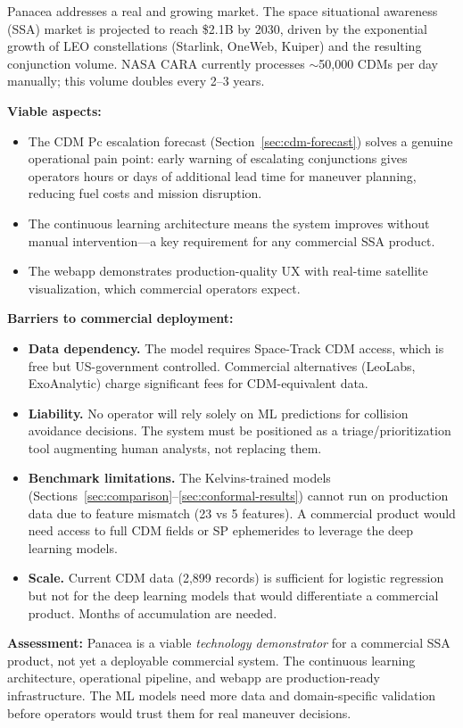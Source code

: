 \documentclass{article}
\begin{document}
Panacea addresses a real and growing market. The space situational awareness (SSA) market is projected to reach \$2.1B by 2030, driven by the exponential growth of LEO constellations (Starlink, OneWeb, Kuiper) and the resulting conjunction volume. NASA CARA currently processes $\sim$50,000 CDMs per day manually; this volume doubles every 2--3 years.

\textbf{Viable aspects:}
\begin{itemize}
\item The CDM Pc escalation forecast (Section~\ref{sec:cdm-forecast}) solves a genuine operational pain point: early warning of escalating conjunctions gives operators hours or days of additional lead time for maneuver planning, reducing fuel costs and mission disruption.
\item The continuous learning architecture means the system improves without manual intervention---a key requirement for any commercial SSA product.
\item The webapp demonstrates production-quality UX with real-time satellite visualization, which commercial operators expect.
\end{itemize}

\textbf{Barriers to commercial deployment:}
\begin{itemize}
\item \textbf{Data dependency.} The model requires Space-Track CDM access, which is free but US-government controlled. Commercial alternatives (LeoLabs, ExoAnalytic) charge significant fees for CDM-equivalent data.
\item \textbf{Liability.} No operator will rely solely on ML predictions for collision avoidance decisions. The system must be positioned as a triage/prioritization tool augmenting human analysts, not replacing them.
\item \textbf{Benchmark limitations.} The Kelvins-trained models (Sections~\ref{sec:comparison}--\ref{sec:conformal-results}) cannot run on production data due to feature mismatch (23 vs 5 features). A commercial product would need access to full CDM fields or SP ephemerides to leverage the deep learning models.
\item \textbf{Scale.} Current CDM data (2,899 records) is sufficient for logistic regression but not for the deep learning models that would differentiate a commercial product. Months of accumulation are needed.
\end{itemize}

\textbf{Assessment:} Panacea is a viable \emph{technology demonstrator} for a commercial SSA product, not yet a deployable commercial system. The continuous learning architecture, operational pipeline, and webapp are production-ready infrastructure. The ML models need more data and domain-specific validation before operators would trust them for real maneuver decisions.
\end{document}
